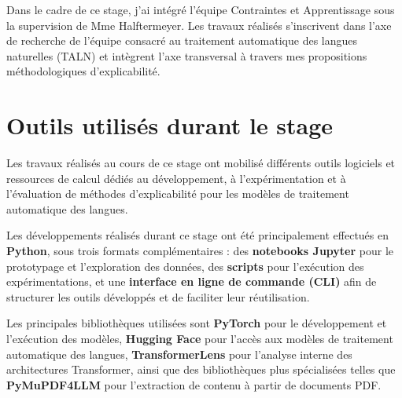     Dans le cadre de ce stage, j'ai intégré l'équipe Contraintes et Apprentissage sous la supervision de Mme Halftermeyer. Les travaux réalisés s'inscrivent dans l'axe de recherche de l'équipe consacré au traitement automatique des langues naturelles (TALN) et intègrent l'axe transversal à travers mes propositions méthodologiques d'explicabilité.

\section{Outils utilisés durant le stage}


    Les travaux réalisés au cours de ce stage ont mobilisé différents outils logiciels et ressources de calcul dédiés au développement, à l'expérimentation et à l'évaluation de méthodes d'explicabilité pour les modèles de traitement automatique des langues.

    Les développements réalisés durant ce stage ont été principalement effectués en \textbf{Python}, sous trois formats complémentaires : des \textbf{notebooks Jupyter} pour le prototypage et l'exploration des données, des \textbf{scripts} pour l'exécution des expérimentations, et une \textbf{interface en ligne de commande (CLI)} afin de structurer les outils développés et de faciliter leur réutilisation.
    
    Les principales bibliothèques utilisées sont \textbf{PyTorch} \cite{paszke_pytorch_2019} pour le développement et l'exécution des modèles, \textbf{Hugging Face} \cite{wolf_huggingfaces_2020} pour l'accès aux modèles de traitement automatique des langues, \textbf{TransformerLens} \cite{nanda_transformerlens_2022} pour l'analyse interne des architectures Transformer, ainsi que des bibliothèques plus spécialisées telles que \textbf{PyMuPDF4LLM} \cite{artifex_software_pymupdf4llm_2026} pour l'extraction de contenu à partir de documents PDF.
    
